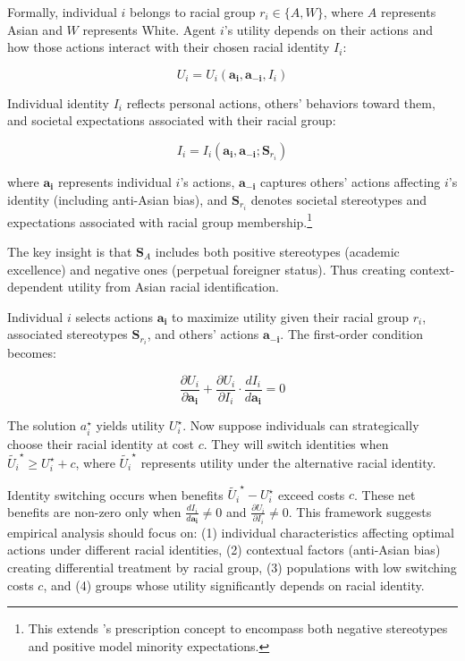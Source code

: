 \documentclass[12pt,english]{article}
\begin{document}
Formally, individual $i$ belongs to racial group $r_i \in \{A, W\}$, where $A$ represents Asian and $W$ represents White. Agent $i$'s utility depends on their actions and how those actions interact with their chosen racial identity $I_i$:

\begin{equation}
U_i = U_i(\pmb{a_i}, \pmb{a_{-i}}, I_i)\label{eq:util}
\end{equation}

Individual identity $I_i$ reflects personal actions, others' behaviors toward them, and societal expectations associated with their racial group:

\begin{equation}
I_i = I_i(\pmb{a_i}, \pmb{a_{-i}}; \pmb{S}_{r_{i}})\label{eq:identity}
\end{equation}

where $\pmb{a_i}$ represents individual $i$'s actions, $\pmb{a_{-i}}$ captures others' actions affecting $i$'s identity (including anti-Asian bias), and $\pmb{S}_{r_{i}}$ denotes societal stereotypes and expectations associated with racial group membership.\footnote{This extends \textcite{akerlofEconomicsIdentity2000}'s prescription concept to encompass both negative stereotypes and positive model minority expectations.}

The key insight is that $\pmb{S}_{A}$ includes both positive stereotypes (academic excellence) and negative ones (perpetual foreigner status). Thus creating context-dependent utility from Asian racial identification.

Individual $i$ selects actions $\pmb{a_i}$ to maximize utility given their racial group $r_i$, associated stereotypes $\pmb{S}_{r_{i}}$, and others' actions $\pmb{a_{-i}}$. The first-order condition becomes:

\begin{equation}
\frac{\partial U_i}{\partial \pmb{a_i}} + \frac{\partial U_i}{\partial I_i} \cdot \frac{d I_i}{d \pmb{a_i}} = 0\label{eq:foc}
\end{equation}

The solution $a_{i}^{\star}$ yields utility $U_{i}^{\star}$. Now suppose individuals can strategically choose their racial identity at cost $c$. They will switch identities when $\tilde{U_{i}}^{\star} \geq U_{i}^{\star} + c$, where $\tilde{U_{i}}^{\star}$ represents utility under the alternative racial identity.

Identity switching occurs when benefits $\tilde{U_{i}}^{\star} - U_{i}^{\star}$ exceed costs $c$. These net benefits are non-zero only when $\frac{d I_i}{d \pmb{a_i}} \neq 0$ and $\frac{\partial U_i}{\partial I_i} \neq 0$. This framework suggests empirical analysis should focus on: (1) individual characteristics affecting optimal actions under different racial identities, (2) contextual factors (anti-Asian bias) creating differential treatment by racial group, (3) populations with low switching costs $c$, and (4) groups whose utility significantly depends on racial identity.
\end{document}
